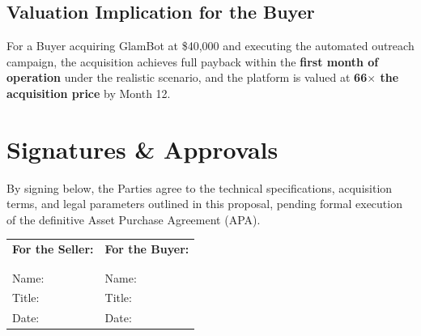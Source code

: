 \documentclass[11pt,a4paper]{report}
\begin{document}
\section{Valuation Implication for the Buyer}
For a Buyer acquiring GlamBot at \$40,000 and executing the automated outreach campaign, the acquisition achieves full payback within the \textbf{first month of operation} under the realistic scenario, and the platform is valued at \textbf{66$\times$ the acquisition price} by Month 12.

\chapter{Signatures \& Approvals}

\vspace{1cm}
By signing below, the Parties agree to the technical specifications, acquisition terms, and legal parameters outlined in this proposal, pending formal execution of the definitive Asset Purchase Agreement (APA).

\vspace{2cm}
\noindent
\begin{tabular}{@{}p{3in} p{3in}@{}}
\textbf{For the Seller:} & \textbf{For the Buyer:} \\
\\
\hrulefill & \hrulefill \\
Name: & Name: \\
Title: & Title: \\
Date: & Date: \\
\end{tabular}
\end{document}
